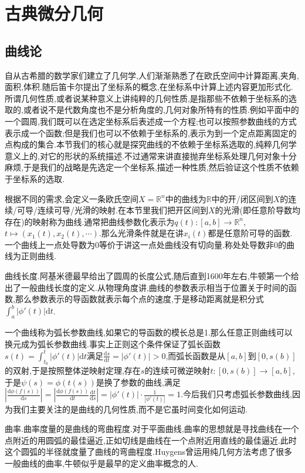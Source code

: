 \chapter{古典微分几何}
\section{曲线论}

自从古希腊的数学家们建立了几何学,人们渐渐熟悉了在欧氏空间中计算距离,夹角,面积,体积.随后笛卡尔提出了坐标系的概念,在坐标系中计算上述内容更加形式化.所谓几何性质,或者说某种意义上讲纯粹的几何性质,是指那些不依赖于坐标系的选取的,或者说不是代数角度也不是分析角度的,几何对象所特有的性质.例如平面中的一个圆周,我们既可以在选定坐标系后表述成一个方程;也可以按照参数曲线的方式表示成一个函数;但是我们也可以不依赖于坐标系的,表示为到一个定点距离固定的点构成的集合.本节我们的核心就是探究曲线的不依赖于坐标系选取的,纯粹几何学意义上的,对它的形状的系统描述.不过通常来讲直接抛弃坐标系处理几何对象十分麻烦,于是我们的战略是先选定一个坐标系,描述一种性质,然后验证这个性质不依赖于坐标系的选取.

根据不同的需求,会定义一条欧氏空间$X=\mathbb{R}^n$中的曲线为$\mathbb{R}$中的开/闭区间到$X$的连续/可导/连续可导/光滑的映射.在本节里我们把开区间到$X$的光滑(即任意阶导数均存在)的映射称为曲线.通常把曲线参数化表示为$q(t):[a,b]\to\mathbb{R}^n$,$t\mapsto(x_1(t),x_2(t),\cdots)$.那么光滑条件就是在讲$x_i(t)$都是任意阶可导的函数.一个曲线上一点处导数为0等价于讲这一点处曲线没有切向量.称处处导数非0的曲线为正则曲线.

曲线长度.阿基米德最早给出了圆周的长度公式,随后直到1600年左右,牛顿第一个给出了一般曲线长度的定义.从物理角度讲,曲线的参数表示相当于位置关于时间的函数,那么参数表示的导函数就表示每个点的速度,于是移动距离就是积分式$\int_a^b|\phi'(t)|\mathrm{d}t$.

一个曲线称为弧长参数曲线,如果它的导函数的模长总是1.那么任意正则曲线可以换元成为弧长参数曲线.事实上正则这个条件保证了弧长函数$s(t)=\int_{t_0}^t|\phi'(t)|\mathrm{d}t$满足$\frac{\mathrm{d}s}{\mathrm{d}t}=|\phi'(t)|>0$,而弧长函数是从$[a,b]$到$[0,s(b)]$的双射,于是按照整体逆映射定理,存在$s$的连续可微逆映射$t:[0,s(b)]\to[a,b]$,于是$\psi(s)=\phi(t(s))$是换了参数的曲线,满足$\left|\frac{\mathrm{d}\phi(f(s))}{\mathrm{d}s}\right|=\left|\frac{\mathrm{d}\phi(f(s))}{\mathrm{d}t}\frac{\mathrm{d}t}{\mathrm{d}s}\right|=|\phi'(t)|\cdot\frac{1}{|\phi'(t)|}=1$.今后我们只考虑弧长参数曲线,因为我们主要关注的是曲线的几何性质,而不是它虽时间变化如何运动.

曲率.曲率度量的是曲线的弯曲程度.对于平面曲线,曲率的思想就是寻找曲线在一个点附近的用圆弧的最佳逼近,正如切线是曲线在一个点附近用直线的最佳逼近.此时这个圆弧的半径就度量了曲线的弯曲程度.Huygens曾运用纯几何方法考虑了很多一般曲线的曲率,牛顿似乎是最早的定义曲率概念的人.

